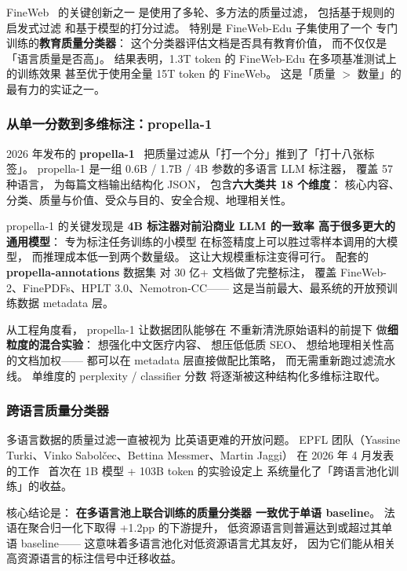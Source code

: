 FineWeb~\cite{penedo2024fineweb} 的关键创新之一
是使用了多轮、多方法的质量过滤，
包括基于规则的启发式过滤
和基于模型的打分过滤。
特别是 FineWeb-Edu 子集使用了一个
专门训练的\textbf{教育质量分类器}：
这个分类器评估文档是否具有教育价值，
而不仅仅是「语言质量是否高」。
结果表明，1.3T token 的 FineWeb-Edu
在多项基准测试上的训练效果
甚至优于使用全量 15T token 的 FineWeb。
这是「质量 $>$ 数量」的最有力的实证之一。

\subsubsection{从单一分数到多维标注：propella-1}

2026 年发布的 \textbf{propella-1}~\cite{propella2026}
把质量过滤从「打一个分」推到了「打十八张标签」。
propella-1 是一组 0.6B / 1.7B / 4B 参数的多语言 LLM 标注器，
覆盖 57 种语言，
为每篇文档输出结构化 JSON，
包含\textbf{六大类共 18 个维度}：
核心内容、分类、质量与价值、受众与目的、安全合规、地理相关性。

propella-1 的关键发现是
\textbf{4B 标注器对前沿商业 LLM 的一致率
高于很多更大的通用模型}：
专为标注任务训练的小模型
在标签精度上可以胜过零样本调用的大模型，
而推理成本低一到两个数量级。
这让大规模重标注变得可行。
配套的 \textbf{propella-annotations} 数据集
对 30 亿+ 文档做了完整标注，
覆盖 FineWeb-2、FinePDFs、HPLT 3.0、Nemotron-CC——
这是当前最大、最系统的开放预训练数据 metadata 层。

从工程角度看，
propella-1 让数据团队能够在
不重新清洗原始语料的前提下
做\textbf{细粒度的混合实验}：
想强化中文医疗内容、
想压低低质 SEO、
想给地理相关性高的文档加权——
都可以在 metadata 层直接做配比策略，
而无需重新跑过滤流水线。
单维度的 perplexity / classifier 分数
将逐渐被这种结构化多维标注取代。

\subsubsection{跨语言质量分类器}

多语言数据的质量过滤一直被视为
比英语更难的开放问题。
EPFL 团队（Yassine Turki、Vinko Sabolčec、Bettina Messmer、Martin Jaggi）
在 2026 年 4 月发表的工作~\cite{aroca2026crosslingual}
首次在 1B 模型 + 103B token 的实验设定上
系统量化了「跨语言池化训练」的收益。

核心结论是：
\textbf{在多语言池上联合训练的质量分类器
一致优于单语 baseline}。
法语在聚合归一化下取得 +1.2pp 的下游提升，
低资源语言则普遍达到或超过其单语 baseline——
这意味着多语言池化对低资源语言尤其友好，
因为它们能从相关高资源语言的标注信号中迁移收益。

